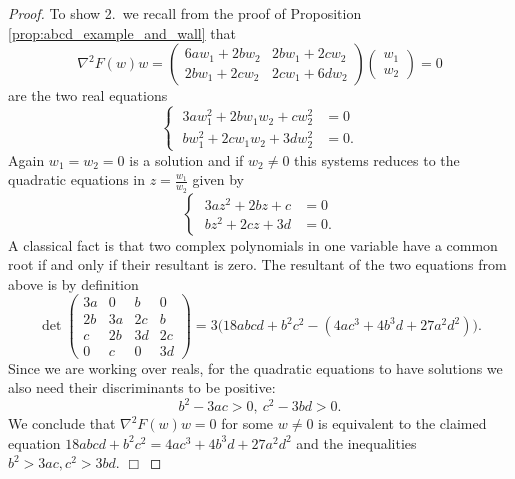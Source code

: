 \documentclass[12pt]{article}
\newcommand{\proofend}{$\Box$\bigskip}
\begin{document}
\begin{proof}
To show 2.~we recall from the proof of Proposition \ref{prop:abcd_example_and_wall} that
\begin{equation}\nonumber
\nabla^2F(w)w=\begin{pmatrix}
6aw_1+2bw_2 & 2bw_1+2cw_2\\
2bw_1+2cw_2 & 2cw_1+6dw_2
\end{pmatrix}
\begin{pmatrix}
w_1\\
w_2
\end{pmatrix}
=0
\end{equation}
are the two real equations
\begin{equation}\nonumber
\left\{\;
\begin{aligned}
3aw_1^2+2bw_1w_2+cw_2^2&=0\\
bw_1^2+2cw_1w_2+3dw_2^2&=0.
\end{aligned}
\right.
\end{equation}
Again $w_1=w_2=0$ is a solution and if $w_2\neq0$ this systems reduces to the quadratic equations in $z=\frac{w_1}{w_2}$ given by
\begin{equation}\nonumber
\left\{\;
\begin{aligned}
3az^2+2bz+c&=0\\
bz^2+2cz+3d&=0.
\end{aligned}
\right.
\end{equation}
A classical fact is that two complex polynomials in one variable have a common root if and only if their resultant is zero. The resultant of the two equations from above is by definition
\begin{equation}\nonumber
\det
\begin{pmatrix}
3a & 0 & b & 0 \\
2b & 3a & 2c & b \\
c & 2b & 3d & 2c \\
0 & c  & 0 & 3d 
\end{pmatrix}=3\big(18abcd+b^2c^2-(4ac^3+4b^3d+27a^2d^2)\big).
\end{equation}
Since we are working over reals, for the quadratic equations to have solutions we also need their discriminants to be positive:
$$
b^2 - 3ac > 0,\ c^2 - 3bd > 0. 
$$ 
We conclude that $\nabla^2F(w)w=0$ for some $w\neq0$ is equivalent to the claimed equation $18abcd+b^2c^2=4ac^3+4b^3d+27a^2d^2$ and the inequalities $b^2>3ac, c^2>3bd$.
\proofend 
\end{proof}
\end{document}
